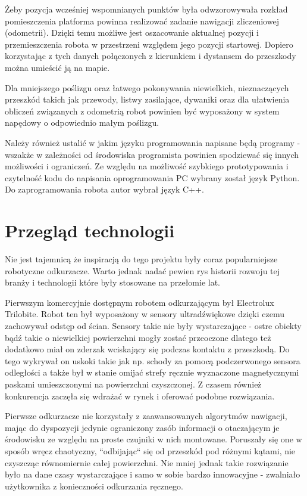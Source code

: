Żeby pozycja wcześniej wspomnianych punktów była odwzorowywała rozkład pomieszczenia platforma powinna realizować zadanie nawigacji zliczeniowej (odometrii). Dzięki temu możliwe jest oszacowanie aktualnej pozycji i przemieszczenia robota w przestrzeni względem jego pozycji startowej. Dopiero korzystając z tych danych połączonych z kierunkiem i dystansem do przeszkody można umieścić ją na mapie.

Dla mniejszego poślizgu oraz łatwego pokonywania niewielkich, nieznaczących przeszkód takich jak przewody, listwy zasilające, dywaniki oraz dla ułatwienia obliczeń związanych z odometrią robot powinien być wyposażony w system napędowy o odpowiednio małym poślizgu.

Należy również ustalić w jakim języku programowania napisane będą programy - wszakże w zależności od środowiska programista powinien spodziewać się innych możliwości i ograniczeń. Ze względu na możliwość szybkiego prototypowania i czytelność kodu do napisania oprogramowania PC wybrany został język Python\cite{python}. Do zaprogramowania robota autor wybrał język C++\cite{cpp}.

\section{Przegląd technologii}
Nie jest tajemnicą że inspiracją do tego projektu były coraz popularniejsze robotyczne odkurzacze. Warto jednak nadać pewien rys historii rozwoju tej branży i technologii które były stosowane na przełomie lat.

Pierwszym komercyjnie dostępnym robotem odkurzającym był Electrolux Trilobite\cite{vacuum-history}. Robot ten był wyposażony w sensory ultradźwiękowe dzięki czemu zachowywał odstęp od ścian. Sensory takie nie były wystarczające - ostre obiekty bądź takie o niewielkiej powierzchni mogły zostać przeoczone dlatego też dodatkowo miał on zderzak wciskający się podczas kontaktu z przeszkodą. Do tego wykrywał on uskoki takie jak np. schody za pomocą podczerwonego sensora odległości a także był w stanie omijać strefy ręcznie wyznaczone magnetycznymi paskami umieszczonymi na powierzchni czyszczonej. Z czasem również konkurencja zaczęła się wdrażać w rynek i oferować podobne rozwiązania.

Pierwsze odkurzacze nie korzystały z zaawansowanych algorytmów nawigacji, mając do dyspozycji jedynie ograniczony zasób informacji o otaczającym je środowisku ze względu na proste czujniki w nich montowane. Poruszały się one w sposób wręcz chaotyczny, ``odbijając`` się od przeszkód pod różnymi kątami, nie czyszcząc równomiernie całej powierzchni. Nie mniej jednak takie rozwiązanie było na dane czasy wystarczające i samo w sobie bardzo innowacyjne - zwalniało użytkownika z konieczności odkurzania ręcznego.

